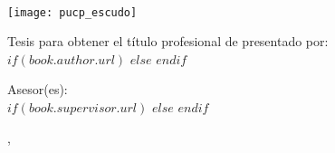 \frontmatter %

\pagestyle{plain} %


\begin{titlepage}
\begin{center}

\vspace*{.06\textheight}
{\scshape\LARGE \MakeUppercase{\textbf{\univname}}\par}\vspace{1.5cm} %
\textsc{\Large \MakeUppercase{\textbf{\facname}}}\\[0.5cm] %

\texttt{[image: pucp\_escudo]} %

{\ttitle\par}\vspace{0.4cm} %

\large {Tesis para obtener el título profesional de \degreename}{ presentado por:}\\[0.3cm] %

$if(book.author.url)$
\href{$book.author.url$}{\authorname} %
$else$
\authorname
$endif$

{Asesor(es):}\\[0.4cm]
$if(book.supervisor.url)$%
\href{$book.supervisor.url$}{\supname} %
$else$%
\supname
$endif$

{\cityname}{, }{\dateyearname}

\vfill
\end{center}
\end{titlepage}




